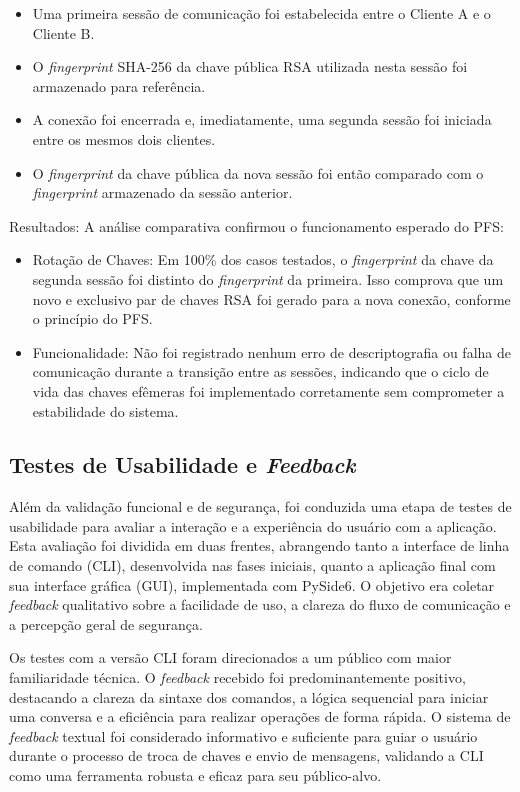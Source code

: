 \begin{itemize}
  \item Uma primeira sessão de comunicação foi estabelecida entre o
    Cliente A e o Cliente B.
  \item O \textit{fingerprint} SHA-256 da chave pública \acs{RSA}
    utilizada nesta
    sessão foi armazenado para referência.
  \item A conexão foi encerrada e, imediatamente, uma segunda sessão
    foi iniciada entre os mesmos dois clientes.
  \item O \textit{fingerprint} da chave pública da nova sessão foi então
    comparado com o \textit{fingerprint} armazenado da sessão anterior.
\end{itemize}

Resultados: A análise comparativa confirmou o funcionamento esperado do PFS:

\begin{itemize}
  \item Rotação de Chaves: Em 100\% dos casos testados, o \textit{fingerprint}
    da chave da segunda sessão foi distinto do \textit{fingerprint} da
    primeira. Isso comprova que um novo e exclusivo par de chaves \acs{RSA}
    foi gerado para a nova conexão, conforme o princípio do PFS.
  \item Funcionalidade: Não foi registrado nenhum erro de
    descriptografia ou falha de comunicação durante a transição entre
    as sessões, indicando que o ciclo de vida das chaves efêmeras foi
    implementado corretamente sem comprometer a estabilidade do sistema.
\end{itemize}

\subsection{Testes de Usabilidade e \textit{Feedback}}

Além da validação funcional e de segurança, foi conduzida uma etapa
de testes de usabilidade para avaliar a interação e a experiência do
usuário com a aplicação. Esta avaliação foi dividida em duas frentes,
abrangendo tanto a interface de linha de comando (\acs{CLI}), desenvolvida
nas fases iniciais, quanto a aplicação final com sua interface
gráfica (\acs{GUI}), implementada com PySide6. O objetivo era coletar
\textit{feedback} qualitativo sobre a facilidade de uso, a clareza do fluxo de
comunicação e a percepção geral de segurança.

Os testes com a versão \acs{CLI} foram direcionados a um público com maior
familiaridade técnica. O \textit{feedback} recebido foi predominantemente
positivo, destacando a clareza da sintaxe dos comandos, a lógica
sequencial para iniciar uma conversa e a eficiência para realizar
operações de forma rápida. O sistema de \textit{feedback} textual foi
considerado informativo e suficiente para guiar o usuário durante o
processo de troca de chaves e envio de mensagens, validando a \acs{CLI}
como uma ferramenta robusta e eficaz para seu público-alvo.

